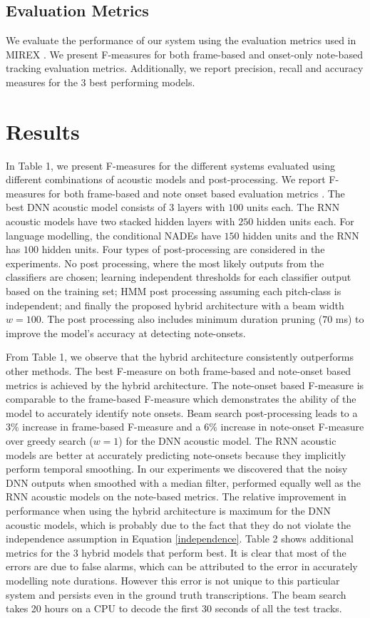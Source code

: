 \documentclass{article}
\begin{document}
\subsection{Evaluation Metrics}

We evaluate the performance of our system using the evaluation metrics used in MIREX \cite{bay2009evaluation}. We present F-measures for both frame-based and onset-only note-based tracking evaluation metrics. Additionally, we report precision, recall and accuracy measures for the 3 best performing models.

\section{Results}
In Table 1, we present F-measures for the different systems evaluated using different combinations of acoustic models and post-processing. We report F-measures for both frame-based and note onset based evaluation metrics \cite{bay2009evaluation}. The best DNN acoustic model consists of $3$ layers with $100$ units each. The RNN acoustic models have two stacked hidden layers with $250$ hidden units each. For language modelling, the conditional NADEs have $150$ hidden units and the RNN has $100$ hidden units. Four types of post-processing are considered in the experiments. No post processing, where the most likely outputs from the classifiers are chosen; learning independent thresholds for each classifier output based on the training set; HMM post processing assuming each pitch-class is independent; and finally the proposed hybrid architecture with a beam width $w = 100$. The post processing also includes minimum duration pruning ($70$ ms) to improve the model's accuracy at detecting note-onsets. 

From Table 1, we observe that the hybrid architecture consistently outperforms other methods. The best F-measure on both frame-based and note-onset based metrics is achieved by the hybrid architecture. The note-onset based F-measure is comparable to the frame-based F-measure which demonstrates the ability of the model to accurately identify note onsets. Beam search post-processing leads to a $3\%$ increase in frame-based F-measure and a $6\%$ increase in note-onset F-measure over greedy search ($w = 1$) for the DNN acoustic model. The RNN acoustic models are better at accurately predicting note-onsets because they implicitly perform temporal smoothing. In our experiments we discovered that the noisy DNN outputs when smoothed with a median filter, performed equally well as the RNN acoustic models on the note-based metrics. The relative improvement in performance when using the hybrid architecture is maximum for the DNN acoustic models, which is probably due to the fact that they do not violate the independence assumption in Equation \ref{independence}.  Table 2 shows additional metrics for the 3 hybrid models that perform best. It is clear that most of the errors are due to false alarms, which can be attributed to the error in accurately modelling note durations. However this error is not unique to this particular system and persists even in the ground truth transcriptions. The beam search takes 20 hours on a CPU to decode the first 30 seconds of all the test tracks. 
\end{document}

